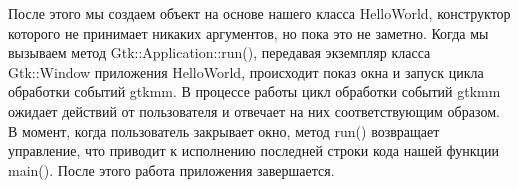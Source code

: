 После этого мы создаем объект на основе нашего класса HelloWorld, конструктор которого не принимает никаких аргументов, но пока это не заметно. Когда мы вызываем метод Gtk::Application::run(), передавая экземпляр класса Gtk::Window приложения HelloWorld, происходит показ окна и запуск цикла обработки событий gtkmm. В процессе работы цикл обработки событий gtkmm ожидает действий от пользователя и отвечает на них соответствующим образом. В момент, когда пользователь закрывает окно, метод run() возвращает управление, что приводит к исполнению последней строки кода нашей функции main(). После этого работа приложения завершается. 